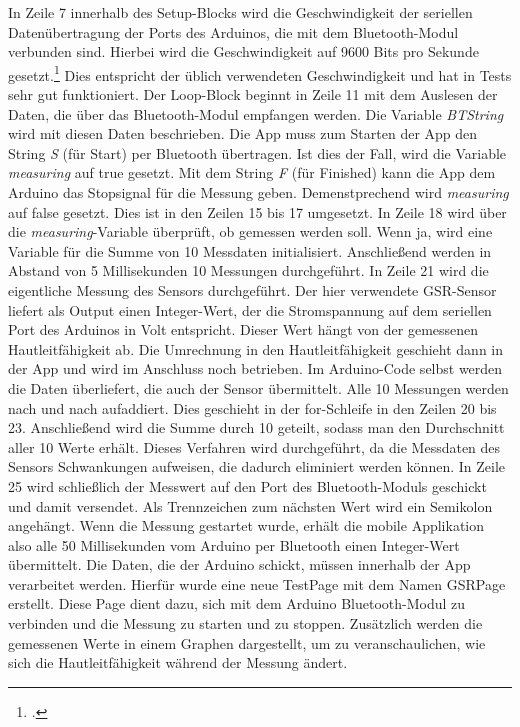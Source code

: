 In Zeile 7 innerhalb des Setup-Blocks wird die Geschwindigkeit der seriellen Datenübertragung der Ports des Arduinos, die mit dem Bluetooth-Modul verbunden sind. Hierbei wird die Geschwindigkeit auf 9600 Bits pro Sekunde gesetzt.\footcite[Vgl.][]{Ard18b} Dies entspricht der üblich verwendeten Geschwindigkeit und hat in Tests sehr gut funktioniert. \newline
Der Loop-Block beginnt in Zeile 11 mit dem Auslesen der Daten, die über das Bluetooth-Modul empfangen werden. Die Variable \textit{BTString} wird mit diesen Daten beschrieben. Die App muss zum Starten der App den String \textit{S} (für Start) per Bluetooth übertragen. Ist dies der Fall, wird die Variable \textit{measuring} auf true gesetzt. Mit dem String \textit{F} (für Finished) kann die App dem Arduino das Stopsignal für die Messung geben. Demenstprechend wird \textit{measuring} auf false gesetzt. Dies ist in den Zeilen 15 bis 17 umgesetzt. \newline
In Zeile 18 wird über die \textit{measuring}-Variable überprüft, ob gemessen werden soll. Wenn ja, wird eine Variable für die Summe von 10 Messdaten initialisiert. Anschließend werden in Abstand von 5 Millisekunden 10 Messungen durchgeführt. In Zeile 21 wird die eigentliche Messung des Sensors durchgeführt. Der hier verwendete GSR-Sensor liefert als Output einen Integer-Wert, der die Stromspannung auf dem seriellen Port des Arduinos in Volt entspricht. Dieser Wert hängt von der gemessenen Hautleitfähigkeit ab. Die Umrechnung in den Hautleitfähigkeit geschieht dann in der App und wird im Anschluss noch betrieben. Im Arduino-Code selbst werden die Daten überliefert, die auch der Sensor übermittelt. Alle 10 Messungen werden nach und nach aufaddiert. Dies geschieht in der for-Schleife in den Zeilen 20 bis 23. Anschließend wird die Summe durch 10 geteilt, sodass man den Durchschnitt aller 10 Werte erhält. Dieses Verfahren wird durchgeführt, da die Messdaten des Sensors Schwankungen aufweisen, die dadurch eliminiert werden können. In Zeile 25 wird schließlich der Messwert auf den Port des Bluetooth-Moduls geschickt und damit versendet. Als Trennzeichen zum nächsten Wert wird ein Semikolon angehängt. \newline
Wenn die Messung gestartet wurde, erhält die mobile Applikation also alle 50 Millisekunden vom Arduino per Bluetooth einen Integer-Wert übermittelt. \newline
Die Daten, die der Arduino schickt, müssen innerhalb der App verarbeitet werden. Hierfür wurde eine neue TestPage mit dem Namen GSRPage erstellt. Diese Page dient dazu, sich mit dem Arduino Bluetooth-Modul zu verbinden und die Messung zu starten und zu stoppen. Zusätzlich werden die gemessenen Werte in einem Graphen dargestellt, um zu veranschaulichen, wie sich die Hautleitfähigkeit während der Messung ändert. \newline \newline
